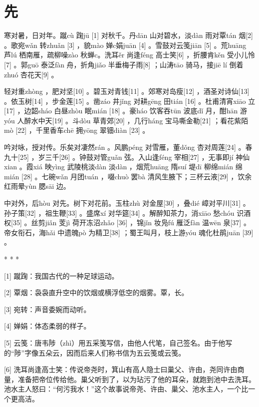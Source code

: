 \documentclass[12pt,UTF8]{ctexbook}
\begin{document}
\setcounter{chapter}{0}

\chapter{先}


寒对暑，日对年。蹴cù 踘jū [1] 对秋千。丹dān 山对碧水，淡dàn 雨对覃tán 烟[2] 。歌宛wǎn 转zhuǎn [3] ，貌mào 婵c娟juān [4] 。雪鼓对云笺jiān [5] 。荒huāng 芦lú 栖南雁，疏柳噪zào 秋蝉c。洗耳ěr 尚逢féng 高士笑[6] ，折腰肯kěn 受小儿怜[7] 。郭guō 泰泛fàn 舟，折角jiǎo 半垂梅子雨[8] ；山涛tāo 骑马，接jiē lí 倒着zhuó 杏花天[9] 。

轻对重zhòng ，肥对坚[10] 。碧玉对青钱[11] 。郊寒对岛瘦[12] ，酒圣对诗仙[13] 。依玉树[14] ，步金莲[15] 。凿záo 井jǐng 对耕gēng 田tián [16] 。杜甫清宵xiāo 立[17] ，边韶sháo 白昼zhòu 眠mián [18] 。豪háo 饮客吞tūn 波底dǐ 月，酣hān 游yóu 人醉水中天[19] 。斗dòu 草青郊[20] ，几行háng 宝马嘶金勒[21] ；看花紫陌mò [22] ，千里香车chē 拥yōng 翠钿diàn [23] 。

吟对咏，授对传。乐矣对凄然rán 。风鹏péng 对雪雁，董dǒng 杏对周莲[24] 。春九十[25] ，岁三千[26] 。钟鼓对管guǎn 弦。入山逢féng 宰相[27] ，无事即jí 神仙xian 。霞xiá 映yìng 武陵桃淡dàn 淡dàn ，烟荒huāng 隋suí 堤dī 柳绵mián 绵mián [28] 。七碗wǎn 月团tuán ，啜chuò 罢bà 清风生腋下；三杯云液[29] ，饮余红雨晕yùn 腮sāi 边。

中对外，后hòu 对先。树下对花前。玉柱zhù 对金屋[30] ，叠dié 嶂对平川[31] 。孙子策[32] ，祖生鞭[33] 。盛席xí 对华筵[34] 。解醉知茶力，消xiāo 愁chóu 识酒权[35] 。丝剪jiǎn 芰jì 荷开冻沼zhǎo [36] ，锦jǐn 妆凫fú 雁泛fàn 温wēn 泉[37] 。帝女衔石，海hǎi 中遗魄pò 为精卫[38] ；蜀王叫月，枝上游yóu 魂化杜鹃juān [39] 。



* * *



[1] 蹴踘：我国古代的一种足球运动。

[2] 覃烟：袅袅直升空中的饮烟或横浮低空的烟雾。覃，长。

[3] 宛转：声音委婉而动听。

[4] 婵娟：体态柔弱的样子。

[5] 云笺：唐韦陟（zhì）用五采笺写信，由他人代笔，自己签名。由于他写的“陟”字像五朵云，因而后来人们称书信为五云笺或云笺。

[6] 洗耳尚逢高士笑：传说帝尧时，箕山有高人隐士曰巢父、许由，尧同许由商量，准备把帝位传给他。巢父听到了，以为玷污了他的耳朵，就跑到池中去洗耳。池水主人怒曰：“何污我水！”这个故事说帝尧、许由、巢父、池水主人，一个比一个更高洁。
\end{document}

